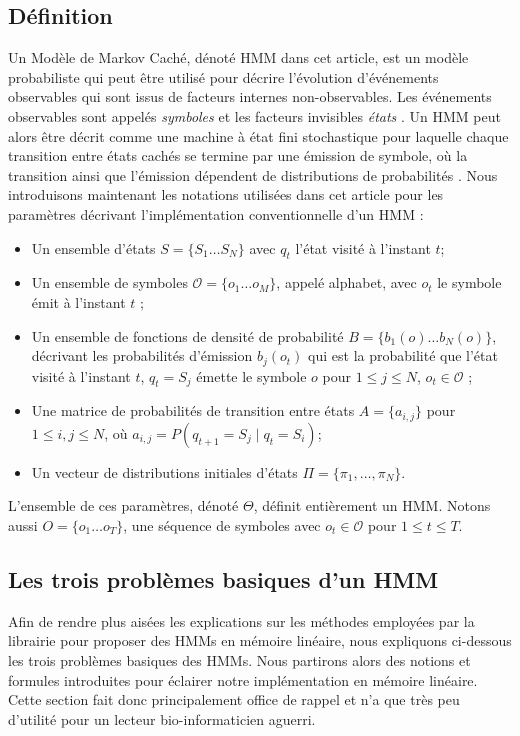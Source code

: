 \documentclass[letterpaper]{article}
\begin{document}
\subsection{Définition}
Un Modèle de Markov Caché, dénoté HMM dans cet article, est un modèle probabiliste qui peut être utilisé pour décrire l'évolution d'événements observables qui sont issus de facteurs internes non-observables. Les événements observables sont appelés \textit{symboles} et les facteurs invisibles \textit{états} \citep{Intro}. Un HMM peut alors être décrit comme une machine à état fini stochastique pour laquelle chaque transition entre états cachés se termine par une émission de symbole, où la transition ainsi que l'émission dépendent de distributions de probabilités \citep{Ch}. Nous introduisons maintenant les notations utilisées dans cet article pour les paramètres décrivant l'implémentation conventionnelle d'un HMM \citep{Ch} : 
\begin{itemize}
	\item Un ensemble d'états $S=\{S_1\dots S_N\}$ avec $q_t$ l'état visité à l'instant $t$;
	\item Un ensemble de symboles $\mathcal{O} = \{o_1\dots o_M\}$, appelé alphabet, avec $o_t$ le symbole émit à l'instant $t$ ;
	\item Un ensemble de fonctions de densité de probabilité $B = \{b_1(o) \dots b_N(o)\}$, décrivant les probabilités d'émission $b_j(o_t)$ qui est la probabilité que l'état visité à l'instant $t$, $q_t = S_j$ émette le symbole $o$ pour $1\leq j\leq N$, $o_t \in \mathcal{O} $ ; 
	\item Une matrice de probabilités de transition entre états $A = \{a_{i, j}\}$ pour $1\leq i, j \leq N$, où $a_{i, j}=P(q_{t+1} = S_j \mid q_t = S_i)$;
	\item Un vecteur de distributions initiales d'états $\Pi = \{\pi_1,\dots ,\pi_N\}$.
\end{itemize}
L'ensemble de ces paramètres, dénoté $\Theta$, définit entièrement un HMM. Notons aussi $O=\{o_1 \dots o_T\}$, une séquence de symboles avec $o_t \in \mathcal{O}$ pour $1 \leq t \leq T$. 

\subsection{Les trois problèmes basiques d'un HMM}
Afin de rendre plus aisées les explications sur les méthodes employées par la librairie pour proposer des HMMs en mémoire linéaire, nous expliquons ci-dessous les trois problèmes basiques des HMMs. Nous partirons alors des notions et formules introduites pour éclairer notre implémentation en mémoire linéaire. Cette section fait donc principalement office de rappel et n'a que très peu d'utilité pour un lecteur bio-informaticien aguerri.
\end{document}
